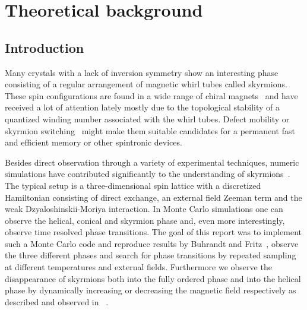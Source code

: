 %
\chapter{Theoretical background}\label{chap:1}
%

%
\section{Introduction}\label{sec:intro}
%
Many crystals with a lack of inversion symmetry show an interesting phase
consisting of a regular arrangement of magnetic whirl tubes called skyrmions.
These spin configurations are found in a wide range of chiral
magnets~\cite{skyrm1, skyrm2, skyrm3, skyrm4, skyrm5, skyrm6, Milde, skyrm8,
skyrm9, skyrm10} and have received a lot of attention lately mostly due to the
topological stability of a quantized winding number associated with the whirl
tubes. Defect mobility or skyrmion switching~\cite{switch} might make them
suitable candidates for a permanent fast and efficient memory or other
spintronic devices.

Besides direct observation through a variety of experimental techniques, numeric
simulations have contributed significantly to the understanding of
skyrmions~\cite{skyrmion, Milde, switch}. The typical setup is a
three-dimensional spin lattice with a discretized Hamiltonian consisting of
direct exchange, an external field Zeeman term and the weak
Dzyaloshinskii-Moriya interaction. In Monte Carlo simulations one can observe
the helical, conical and skyrmion phase and, even more interestingly, observe
time resolved phase transitions. The goal of this report was to implement such a
Monte Carlo code and reproduce results by Buhrandt and Fritz~\cite{skyrmion},
\ie{} observe the three different phases and search for phase transitions by
repeated sampling at different temperatures and external fields. Furthermore we
observe the disappearance of skyrmions both into the fully ordered phase and
into the helical phase by dynamically increasing or decreasing the magnetic
field respectively as described and observed in~\cite{Milde} .

